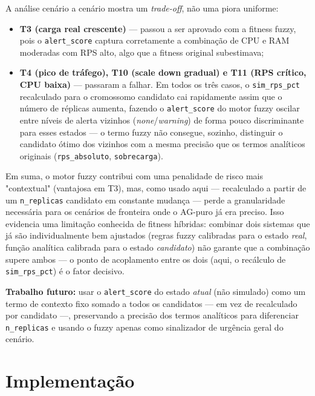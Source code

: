 \documentclass[12pt, a4paper]{article}
\begin{document}
A análise cenário a cenário mostra um \emph{trade-off}, não uma piora uniforme:

\begin{itemize}
  \item \textbf{T3 (carga real crescente)} — passou a ser aprovado com a fitness fuzzy, pois o \texttt{alert\_score} captura corretamente a combinação de CPU e RAM moderadas com RPS alto, algo que a fitness original subestimava;
  \item \textbf{T4 (pico de tráfego), T10 (scale down gradual) e T11 (RPS crítico, CPU baixa)} — passaram a falhar. Em todos os três casos, o \texttt{sim\_rps\_pct} recalculado para o cromossomo candidato cai rapidamente assim que o número de réplicas aumenta, fazendo o \texttt{alert\_score} do motor fuzzy oscilar entre níveis de alerta vizinhos (\textit{none}/\textit{warning}) de forma pouco discriminante para esses estados — o termo fuzzy não consegue, sozinho, distinguir o candidato ótimo dos vizinhos com a mesma precisão que os termos analíticos originais (\texttt{rps\_absoluto}, \texttt{sobrecarga}).
\end{itemize}

Em suma, o motor fuzzy contribui com uma penalidade de risco mais "contextual" (vantajosa em T3), mas, como usado aqui — recalculado a partir de um \texttt{n\_replicas} candidato em constante mudança — perde a granularidade necessária para os cenários de fronteira onde o AG-puro já era preciso. Isso evidencia uma limitação conhecida de fitness híbridas: combinar dois sistemas que já são individualmente bem ajustados (regras fuzzy calibradas para o estado \emph{real}, função analítica calibrada para o estado \emph{candidato}) não garante que a combinação supere ambos — o ponto de acoplamento entre os dois (aqui, o recálculo de \texttt{sim\_rps\_pct}) é o fator decisivo.

\textbf{Trabalho futuro:} usar o \texttt{alert\_score} do estado \emph{atual} (não simulado) como um termo de contexto fixo somado a todos os candidatos — em vez de recalculado por candidato —, preservando a precisão dos termos analíticos para diferenciar \texttt{n\_replicas} e usando o fuzzy apenas como sinalizador de urgência geral do cenário.

\section{Implementação}
\end{document}
